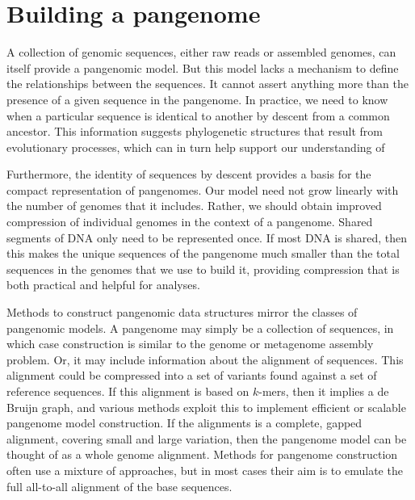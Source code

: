 \section{Building a pangenome}

A collection of genomic sequences, either raw reads or assembled genomes, can itself provide a pangenomic model.
But this model lacks a mechanism to define the relationships between the sequences.
It cannot assert anything more than the presence of a given sequence in the pangenome.
In practice, we need to know when a particular sequence is identical to another by descent from a common ancestor.
This information suggests phylogenetic structures that result from evolutionary processes, which can in turn help support our understanding of 

Furthermore, the identity of sequences by descent provides a basis for the compact representation of pangenomes.
Our model need not grow linearly with the number of genomes that it includes.
Rather, we should obtain improved compression of individual genomes in the context of a pangenome.
Shared segments of DNA only need to be represented once.
If most DNA is shared, then this makes the unique sequences of the pangenome much smaller than the total sequences in the genomes that we use to build it, providing compression that is both practical and helpful for analyses.

Methods to construct pangenomic data structures mirror the classes of pangenomic models.
A pangenome may simply be a collection of sequences, in which case construction is similar to the genome or metagenome assembly problem.
Or, it may include information about the alignment of sequences.
This alignment could be compressed into a set of variants found against a set of reference sequences.
If this alignment is based on $k$-mers, then it implies a de Bruijn graph, and various methods exploit this to implement efficient or scalable pangenome model construction.
If the alignments is a complete, gapped alignment, covering small and large variation, then the pangenome model can be thought of as a whole genome alignment.
Methods for pangenome construction often use a mixture of approaches, but in most cases their aim is to emulate the full all-to-all alignment of the base sequences.


